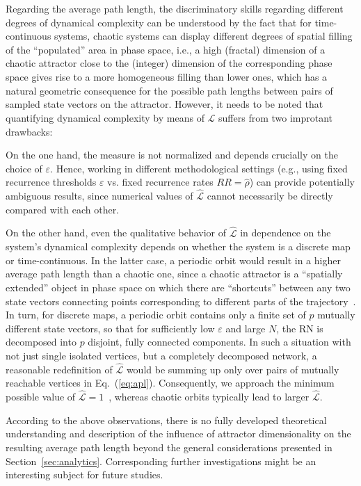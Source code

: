 Regarding the average path length, the discriminatory skills regarding different degrees of dynamical complexity can be understood by the fact that for time-continuous systems, chaotic systems can display different degrees of spatial filling of the ``populated'' area in phase space, i.e., a high (fractal) dimension of a chaotic attractor close to the (integer) dimension of the corresponding phase space gives rise to a more homogeneous filling than lower ones, which has a natural geometric consequence for the possible path lengths between pairs of sampled state vectors on the attractor. However, it needs to be noted that quantifying dynamical complexity by means of $\hat{\mathcal{L}}$ suffers from two improtant drawbacks: 

On the one hand, the measure is not normalized and depends crucially on the choice of $\varepsilon$. Hence, working in different methodological settings (e.g., using fixed recurrence thresholds $\varepsilon$ vs. fixed recurrence rates $RR=\hat{\rho}$) can provide potentially ambiguous results, since numerical values of $\hat{\mathcal{L}}$ cannot necessarily be directly compared with each other. 

On the other hand, even the qualitative behavior of $\hat{\mathcal{L}}$ in dependence on the system's dynamical complexity depends on whether the system is a discrete map or time-continuous. In the latter case, a periodic orbit would result in a higher average path length than a chaotic one, since a chaotic attractor is a ``spatially extended'' object in phase space on which there are ``shortcuts'' between any two state vectors connecting points corresponding to different parts of the trajectory~\cite{Donner2010NJP}. In turn, for discrete maps, a periodic orbit contains only a finite set of $p$ mutually different state vectors, so that for sufficiently low $\varepsilon$ and large $N$, the RN is decomposed into $p$ disjoint, fully connected components. In such a situation with not just single isolated vertices, but a completely decomposed network, a reasonable redefinition of $\hat{\mathcal{L}}$ would be summing up only over pairs of mutually reachable vertices in Eq.~(\ref{eq:apl}). Consequently, we approach the minimum possible value of $\hat{\mathcal{L}}=1$~\cite{Marwan2009}, whereas chaotic orbits typically lead to larger $\hat{\mathcal{L}}$.

According to the above observations, there is no fully developed theoretical understanding and description of the influence of attractor dimensionality on the resulting average path length beyond the general considerations presented in Section~\ref{sec:analytics}. Corresponding further investigations might be an interesting subject for future studies.


